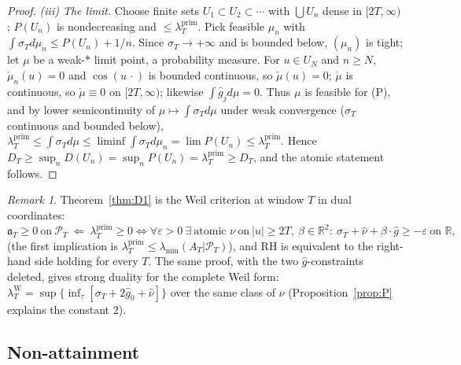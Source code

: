 \documentclass[11pt]{amsart}
\theoremstyle{definition}
\theoremstyle{remark}
\newtheorem{remark}[theorem]{Remark}
\newcommand{\R}{\mathbb R}
\newcommand{\PT}{\mathcal P_T}
\newcommand{\lamP}{\lambda^{\mathrm{prim}}_T}
\newcommand{\lamW}{\lambda^{\mathrm W}_T}
\newcommand{\lamA}{\lambda_{\min}(A_T|\PT)}
\newcommand{\sT}{\sigma_T}
\newcommand{\gh}[1]{\widehat g_{#1}}
\newcommand{\nuh}{\widehat\nu}
\begin{document}
\begin{proof}
\emph{(iii) The limit.} Choose finite sets $U_1\subset U_2\subset\cdots$ with $\bigcup U_n$ dense in
$[2T,\infty)$; $P(U_n)$ is nondecreasing and $\le\lamP$. Pick feasible $\mu_n$ with
$\int\sT d\mu_n\le P(U_n)+1/n$. Since $\sT\to+\infty$ and is bounded below, $(\mu_n)$ is tight;
let $\mu$ be a weak-$*$ limit point, a probability measure. For $u\in U_N$ and $n\ge N$,
$\check\mu_n(u)=0$ and $\cos(u\,\cdot)$ is bounded continuous, so $\check\mu(u)=0$; $\check\mu$
is continuous, so $\check\mu\equiv0$ on $[2T,\infty)$; likewise $\int\gh jd\mu=0$. Thus $\mu$ is
feasible for (P), and by lower semicontinuity of $\mu\mapsto\int\sT d\mu$ under weak convergence
($\sT$ continuous and bounded below), $\lamP\le\int\sT d\mu\le\liminf\int\sT d\mu_n=\lim P(U_n)\le\lamP$.
Hence $D_T\ge\sup_nD(U_n)=\sup_nP(U_n)=\lamP\ge D_T$, and the atomic statement follows.
\end{proof}

\begin{remark}
Theorem~\ref{thm:D1} is the Weil criterion at window $T$ in dual coordinates:
\[
\mathfrak a_T\ge0\ \text{on}\ \PT\ \Longleftarrow\ \lamP\ge0\iff
\forall\varepsilon>0\ \exists\ \text{atomic }\nu\ \text{on}\ |u|\ge2T,\ \beta\in\R^2:\
\sT+\nuh+\beta\cdot\widehat g\ge-\varepsilon\ \text{on }\R,
\]
(the first implication is $\lamP\le\lamA$),
and RH is equivalent to the right-hand side holding for every $T$. The same proof, with the two $\widehat g$-constraints deleted, gives strong duality for
the complete Weil form: $\lamW=\sup\{\inf_\tau[\sT+2\gh0+\nuh]\}$ over the same class of $\nu$
(Proposition~\ref{prop:P} explains the constant $2$).
\end{remark}

\subsection{Non-attainment}
\end{document}
